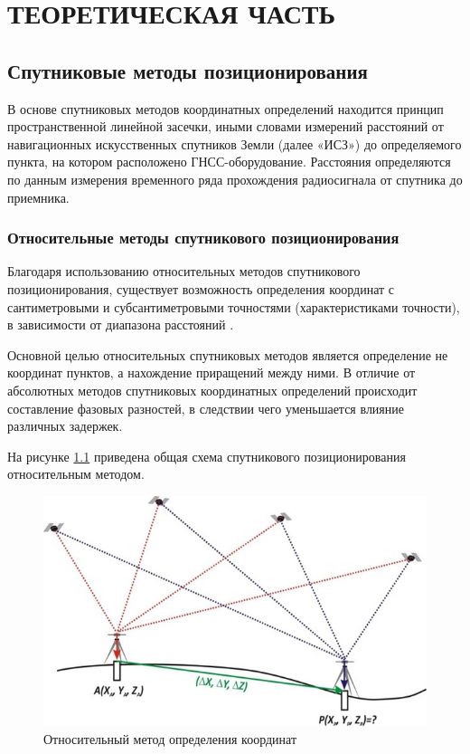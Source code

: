 \chapter{ТЕОРЕТИЧЕСКАЯ ЧАСТЬ}\label{ch:ch1}

\section{Спутниковые методы позиционирования }\label{sec:ch1/sec1}

В основе спутниковых методов координатных определений находится принцип пространственной линейной засечки, иными словами измерений расстояний от навигационных искусственных спутников Земли (далее «ИСЗ») до определяемого пункта, на котором расположено ГНСС-оборудование.  Расстояния определяются по данным измерения временного ряда прохождения радиосигнала от спутника до приемника.

\subsection{Относительные методы спутникового позиционирования}\label{subsec:ch1/sec1/sub1}

Благодаря использованию относительных методов спутникового позиционирования, существует возможность определения координат с сантиметровыми и субсантиметровыми точностями (характеристиками точности), в зависимости от диапазона расстояний \cite{src01,src09}.

Основной целью относительных спутниковых методов является определение не координат пунктов, а нахождение приращений между ними. В отличие от абсолютных методов спутниковых координатных определений происходит составление фазовых разностей, в следствии чего уменьшается влияние различных задержек.

На рисунке \cref{fig:pic01} приведена общая схема спутникового позиционирования относительным методом.

\begin{figure}[h]
	\centering
	\includegraphics[width=0.7\linewidth]{images/pic01}
	\caption{Относительный метод определения координат}
	\label{fig:pic01}
\end{figure}

